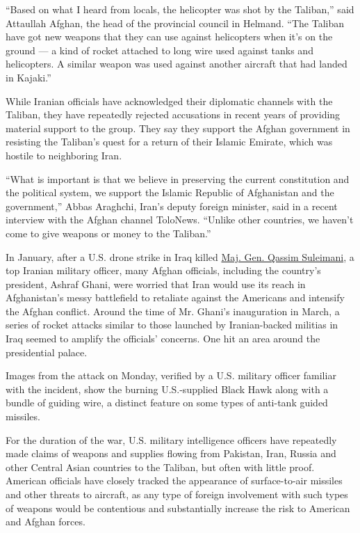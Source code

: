 ``Based on what I heard from locals, the helicopter was shot by the
Taliban,'' said Attaullah Afghan, the head of the provincial council in
Helmand. ``The Taliban have got new weapons that they can use against
helicopters when it's on the ground --- a kind of rocket attached to
long wire used against tanks and helicopters. A similar weapon was used
against another aircraft that had landed in Kajaki.''

While Iranian officials have acknowledged their diplomatic channels with
the Taliban, they have repeatedly rejected accusations in recent years
of providing material support to the group. They say they support the
Afghan government in resisting the Taliban's quest for a return of their
Islamic Emirate, which was hostile to neighboring Iran.

``What is important is that we believe in preserving the current
constitution and the political system, we support the Islamic Republic
of Afghanistan and the government,'' Abbas Araghchi, Iran's deputy
foreign minister, said in a recent interview with the Afghan channel
ToloNews. ``Unlike other countries, we haven't come to give weapons or
money to the Taliban.''

In January, after a U.S. drone strike in Iraq killed
\href{https://www.nytimes.com/2020/01/03/world/middleeast/suleimani-dead.html}{Maj.
Gen. Qassim Suleimani}, a top Iranian military officer, many Afghan
officials, including the country's president, Ashraf Ghani, were worried
that Iran would use its reach in Afghanistan's messy battlefield to
retaliate against the Americans and intensify the Afghan conflict.
Around the time of Mr. Ghani's inauguration in March, a series of rocket
attacks similar to those launched by Iranian-backed militias in Iraq
seemed to amplify the officials' concerns. One hit an area around the
presidential palace.

Images from the attack on Monday, verified by a U.S. military officer
familiar with the incident, show the burning U.S.-supplied Black Hawk
along with a bundle of guiding wire, a distinct feature on some types of
anti-tank guided missiles.

For the duration of the war, U.S. military intelligence officers have
repeatedly made claims of weapons and supplies flowing from Pakistan,
Iran, Russia and other Central Asian countries to the Taliban, but often
with little proof. American officials have closely tracked the
appearance of surface-to-air missiles and other threats to aircraft, as
any type of foreign involvement with such types of weapons would be
contentious and substantially increase the risk to American and Afghan
forces.

